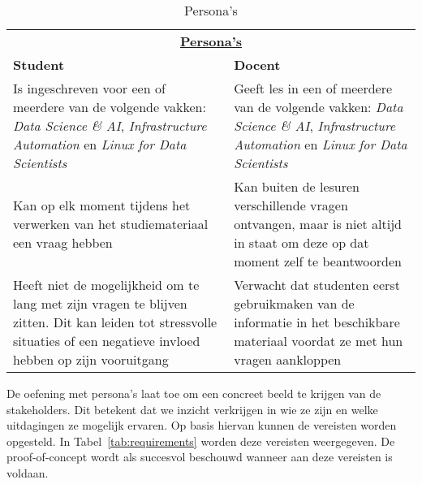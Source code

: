 \begin{table}[ht]
    \small 
    \centering
    \begin{tabular}{p{7cm} p{7cm}}
        \multicolumn{2}{c}{\uline{\textbf{Persona's}}} \\
        \addlinespace[0.5ex]
        \textbf{Student} & \textbf{Docent} \\
        \midrule
        Is ingeschreven voor een of meerdere van de volgende vakken: \textit{Data Science \& AI}, \textit{Infrastructure Automation} en \textit{Linux for Data Scientists} &
        Geeft les in een of meerdere van de volgende vakken: \textit{Data Science \& AI}, \textit{Infrastructure Automation} en \textit{Linux for Data Scientists} \\
        Kan op elk moment tijdens het verwerken van het studiemateriaal een vraag hebben &
        Kan buiten de lesuren verschillende vragen ontvangen, maar is niet altijd in staat om deze op dat moment zelf te beantwoorden \\
        Heeft niet de mogelijkheid om te lang met zijn vragen te blijven zitten. Dit kan leiden tot stressvolle situaties of een negatieve invloed hebben op zijn vooruitgang &
        Verwacht dat studenten eerst gebruikmaken van de informatie in het beschikbare materiaal voordat ze met hun vragen aankloppen \\
        \bottomrule
    \end{tabular}
    \caption{Persona's}
    \label{tab:personas}
\end{table}

De oefening met persona’s laat toe om een concreet beeld te krijgen van de stakeholders. Dit betekent dat we inzicht verkrijgen in wie ze zijn en welke uitdagingen ze mogelijk ervaren. Op basis hiervan kunnen de vereisten worden opgesteld. In Tabel~\ref{tab:requirements} worden deze vereisten weergegeven. De proof-of-concept wordt als succesvol beschouwd wanneer aan deze vereisten is voldaan.

